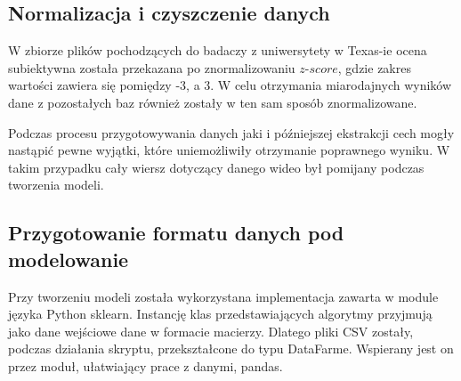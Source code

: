 \subsection{Normalizacja i czyszczenie danych}
W zbiorze plików pochodzących do badaczy z uniwersytety w Texas-ie ocena subiektywna została przekazana po znormalizowaniu $z$-$score$, gdzie zakres wartości zawiera się pomiędzy -3, a 3. W celu otrzymania miarodajnych wyników dane z pozostałych baz również zostały w ten sam sposób znormalizowane.\par
Podczas procesu przygotowywania danych jaki i późniejszej ekstrakcji cech mogły nastąpić pewne wyjątki, które uniemożliwiły otrzymanie poprawnego wyniku. W takim przypadku cały wiersz dotyczący danego wideo był pomijany podczas tworzenia modeli.

\subsection{Przygotowanie formatu danych pod modelowanie}

Przy tworzeniu modeli została wykorzystana implementacja zawarta w module języka Python sklearn. Instancję klas przedstawiających algorytmy przyjmują jako dane wejściowe dane w formacie macierzy. Dlatego pliki CSV zostały, podczas działania skryptu, przekształcone do typu DataFarme. Wspierany jest on przez moduł, ułatwiający prace z danymi, pandas.\par

